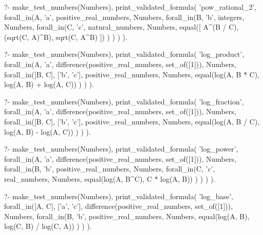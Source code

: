 \begin{fact}
\begin{prolog}
?-	make_test_numbers(Numbers),
	print_validated_formula(
		'pow_rational_2',
		forall_in(A, 'a', positive_real_numbers, Numbers,
			forall_in(B, 'b', integers, Numbers,
				forall_in(C, 'c', natural_numbers, Numbers,
					equal([
						A^(B / C),
						(sqrt(C, A)^B),
						sqrt(C, A^B)
					])
				)
			)
		)
	).				
\end{prolog}
\begin{prolog}
?-	make_test_numbers(Numbers),
	print_validated_formula(
		'log_product',
		forall_in(A, 'a', difference(positive_real_numbers, set_of([1])), Numbers,
			forall_in([B, C], ['b', 'c'], positive_real_numbers, Numbers,
				equal(log(A, B * C), log(A, B) + log(A, C))
			)
		)
	).				
\end{prolog}
\begin{prolog}
?-	make_test_numbers(Numbers),
	print_validated_formula(
		'log_fraction',
		forall_in(A, 'a', difference(positive_real_numbers, set_of([1])), Numbers,
			forall_in([B, C], ['b', 'c'], positive_real_numbers, Numbers,
				equal(log(A, B / C), log(A, B) - log(A, C))
			)
		)
	).				
\end{prolog}
\begin{prolog}
?-	make_test_numbers(Numbers),
	print_validated_formula(
		'log_power',
		forall_in(A, 'a', difference(positive_real_numbers, set_of([1])), Numbers,
			forall_in(B, 'b', positive_real_numbers, Numbers, 
				forall_in(C, 'c', real_numbers, Numbers,
					equal(log(A, B^C), C * log(A, B))
				)
			)
		)
	).
\end{prolog}
\begin{prolog}
?-	make_test_numbers(Numbers),
	print_validated_formula(
		'log_base',
		forall_in([A, C], ['a', 'c'], difference(positive_real_numbers, set_of([1])), Numbers,
			forall_in(B, 'b', positive_real_numbers, Numbers,
				equal(log(A, B), log(C, B) / log(C, A))
			)
		)
	).				
\end{prolog}
\end{fact}
